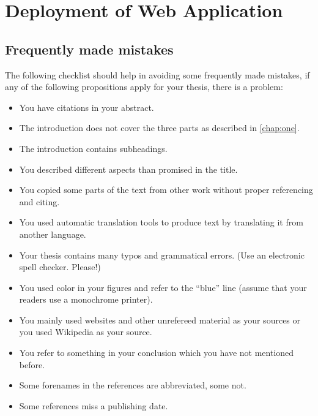 \chapter{Deployment of Web Application}
\label{chap:five}

\section{Frequently made mistakes}

The following checklist should help in avoiding some frequently made mistakes, if any of the following propositions apply for your thesis, there is a problem:

\begin{itemize} 
		\item You have citations in your abstract.
		\item The introduction does not cover the three parts as described in \autoref{chap:one}.
		\item The introduction contains subheadings.
		\item You described different aspects than promised in the title.
		\item You copied some parts of the text from other work without proper referencing and citing.
		\item You used automatic translation tools to produce text by translating it from another language.
		\item Your thesis contains many typos and grammatical errors. (Use an electronic spell checker. Please!)
		\item You used color in your figures and refer to the ``blue'' line (assume that your readers use a monochrome printer).
		\item You mainly used websites and other unrefereed material as your sources or you used Wikipedia as your source.
		\item You refer to something in your conclusion which you have not mentioned before.
		\item Some forenames in the references are abbreviated, some not.
		\item Some references miss a publishing date.
\end{itemize}


